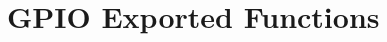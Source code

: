 \hypertarget{group___g_p_i_o_ex___exported___functions}{}\section{G\+P\+IO Exported Functions}
\label{group___g_p_i_o_ex___exported___functions}
